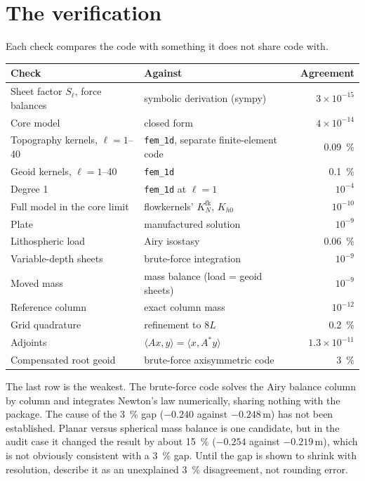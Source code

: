 \section{The verification}

Each check compares the code with something it does not share code with.

\begin{center}
\begin{longtable}{p{}p{}r}
\toprule
Check & Against & Agreement\\
\midrule
\endhead
Sheet factor $S_\ell$, force balances & symbolic derivation (sympy) & $3\times10^{-15}$\\
Core model & closed form & $4\times10^{-14}$\\
Topography kernels, $\ell=1$--40 & \texttt{fem\_1d}, separate finite-element code & \qty{0.09}{\percent}\\
Geoid kernels, $\ell=1$--40 & \texttt{fem\_1d} & \qty{0.1}{\percent}\\
Degree 1 & \texttt{fem\_1d} at $\ell=1$ & $10^{-4}$\\
Full model in the core limit & flowkernels' $K_N^{\mathrm{fk}}$, $K_{h0}$ & $10^{-10}$\\
Plate & manufactured solution & $10^{-9}$\\
Lithospheric load & Airy isostasy & \qty{0.06}{\percent}\\
Variable-depth sheets & brute-force integration & $10^{-9}$\\
Moved mass & mass balance (load = geoid sheets) & $10^{-9}$\\
Reference column & exact column mass & $10^{-12}$\\
Grid quadrature & refinement to $8L$ & \qty{0.2}{\percent}\\
Adjoints & $\langle Ax, y\rangle = \langle x, A^*y\rangle$ & $1.3\times10^{-11}$\\
Compensated root geoid & brute-force axisymmetric code & \qty{3}{\percent}\\
\bottomrule
\end{longtable}
\end{center}

The last row is the weakest.
The brute-force code solves the Airy balance column by column and integrates Newton's law numerically, sharing nothing with the package.
The cause of the \qty{3}{\percent} gap ($-0.240$ against $-0.248$\,m) has not been established.
Planar versus spherical mass balance is one candidate, but in the audit case it changed the result by about \qty{15}{\percent} ($-0.254$ against $-0.219$\,m), which is not obviously consistent with a \qty{3}{\percent} gap.
Until the gap is shown to shrink with resolution, describe it as an unexplained \qty{3}{\percent} disagreement, not rounding error.

